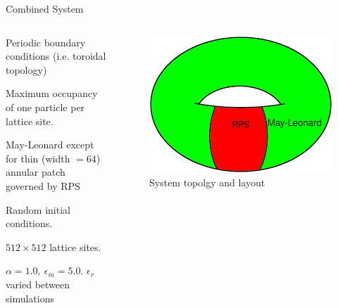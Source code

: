 \documentclass{beamer}
\begin{document}
    \begin{frame}[t]{Combined System}
        \begin{columns}
            \begin{column}{0.5\textwidth}
                \begin{itemize}
                    \small{
                    \item Periodic boundary conditions (i.e. toroidal topology)
                    \item Maximum occupancy of one particle per lattice site.
                    \item May-Leonard except for thin (width $= 64 $) annular patch governed by RPS
                    \item Random initial conditions.
                    \item $ 512 \times 512 $ lattice sites.
                    \item $ \alpha = 1.0, \ \epsilon_m = 5.0 $. $ \epsilon_r $ varied between simulations
                    }
                \end{itemize}
            \end{column}
            \begin{column}{0.5\textwidth}
                \begin{figure}[h]
                    \centering
                    \includegraphics[width=\linewidth]{images/Model_Illustration.png}
                    \caption{System topolgy and layout}
                    \label{fig:plane_wave_2}
                \end{figure}
            \end{column}
        \end{columns}
    \end{frame}
\end{document}
